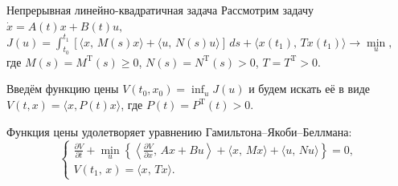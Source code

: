        \begin{frame}{Непрерывная линейно-квадратичная задача}
                Рассмотрим задачу
                $
                        \dot x = A(t)x+B(t)u,
                $
                $
                        J(u)
                =
                        \int_{t_0}^{t_1}
                [
                \langle
                x,\,M(s)x
                \rangle
                +
                \langle
                u,\,N(s)u
                \rangle
                ]\,ds
                        +
                        \langle
                        x(t_1),\,Tx(t_1)
                        \rangle
                \to
                        \min\limits_{u},
                $
где $M(s) = M^{\mathrm{T}}(s) \geqslant 0$,
$N(s) = N^{\mathrm{T}}(s) > 0$,
$T = T^{\mathrm{T}} > 0$.
                \vspace{1cm}

                Введём функцию цены
                $
                        V(t_0, x_0) = \inf_{u}{J(u)}
                $ и будем искать её в виде $V(t,x) = \langle x, P(t) x\rangle$, где $P(t) = P^{\mathrm{T}}(t) > 0.$

                \vspace{1cm}

                Функция цены удолетворяет уравнению Гамильтона--Якоби--Беллмана:
                \begin{equation*}
\begin{cases}
        \frac{\partial V}{\partial t}
        +
        \min\limits_{u}
        \left\{
        
\left\langle
\frac{\partial V}{\partial x}
,\,
Ax + Bu
\right\rangle
+
\langle
x,\,Mx
\rangle
+
\langle
u,\,Nu
\rangle
        
        \right\}
        =
        0,
\\
        V(t_1,\,x)
        =
        \langle x,\,Tx \rangle.
\end{cases}
\end{equation*}
        \end{frame}
